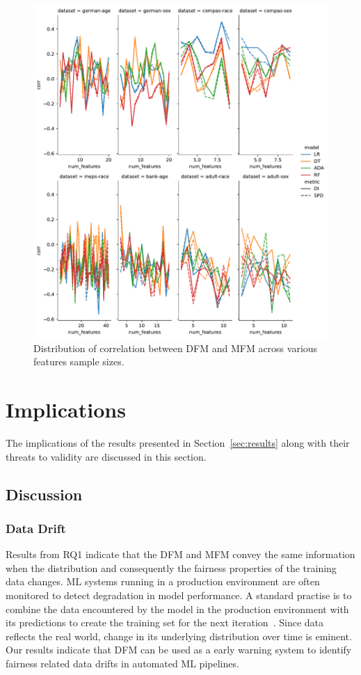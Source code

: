 \documentclass{article}
\begin{document}
\begin{figure}
  \centering
  \includegraphics[width=0.95\linewidth]{lineplot--num-features--corr.pdf}
  \caption{Distribution of correlation between DFM and MFM across
  various features sample sizes.}
  \label{fig:lineplot--num-features--corr}
\end{figure}

\section{Implications}\label{sec:implications}
The implications of the results presented in Section \ref{sec:results}
along with their threats to validity are discussed in this section.

\subsection{Discussion}\label{sec:discuss}
\subsubsection{Data Drift}\label{sec:discuss-data-drift}

Results from RQ1 indicate that the DFM and MFM convey the same
information when the distribution and consequently the fairness
properties of the training data changes. ML systems running in
a production environment are often monitored to detect degradation in
model performance. A standard practise is to combine the data
encountered by the model in the production environment with its
predictions to create the training set for the next
iteration \cite{biessmann2021automated}. Since data reflects the real
world, change in its underlying distribution over time is eminent. Our
results indicate that DFM can be used as a early warning system to
identify fairness related data drifts in automated ML pipelines.
\end{document}
